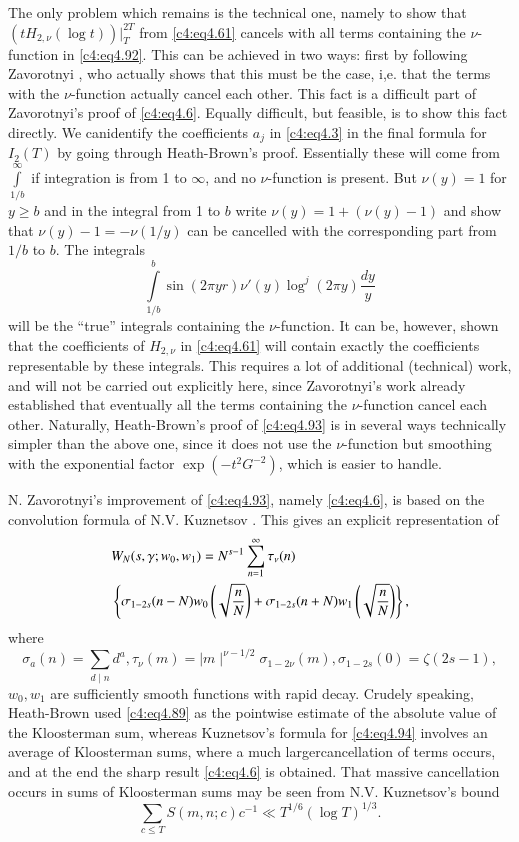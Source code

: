 The only problem which remains is the technical one, namely to show
that $(t H_{2, \nu} (\log t))\bigg|_T^{2T}$ from \eqref{c4:eq4.61}
cancels with all terms containing the $\nu$-function in
\eqref{c4:eq4.92}. This can be achieved in two ways: first by
following Zavorotnyi \cite{Zavorotnyi1}, who actually shows that this must be
the case, i,e. that the terms with the $\nu$-function actually cancel
each other. This fact is a difficult part of Zavorotnyi's proof of
\eqref{c4:eq4.6}. Equally difficult, but feasible, is to show this
fact directly. We can\pageoriginale identify the coefficients $a_j$ in
\eqref{c4:eq4.3} in the final formula for $I_2 (T)$ by going through
Heath-Brown's proof. Essentially these will come from
$\int\limits_{1/b}^\infty$ if integration is from 1 to $\infty$, and
no $\nu$-function is present. But $\nu (y) =1$ for $y \geq b$ and in
the integral from 1 to $b$ write $\nu(y) =1+ (\nu (y)-1)$ and show
that $\nu (y) -1 =- \nu (1/y)$ can be cancelled with the corresponding
part from $1/b$ to $b$. The  integrals
$$
\int\limits_{1/b}^b \sin (2 \pi y r)\nu' (y) \log^j (2 \pi y) \frac{dy}{y}
$$ 
will be the ``true'' integrals containing the $\nu$-function. It can
be, however, shown that the coefficients of $H_{2, \nu}$ in
\eqref{c4:eq4.61} will contain exactly the coefficients representable
by these integrals. This requires a lot of additional (technical)
work, and will not be carried out explicitly here, since Zavorotnyi's
work already established that eventually all the terms containing the
$\nu$-function cancel each other. Naturally, Heath-Brown's proof of
\eqref{c4:eq4.93} is in several ways technically simpler than the
above one, since it does not use the $\nu$-function but smoothing with
the exponential factor $\exp (-t^2 G^{-2})$, which is easier to
handle.

N. Zavorotnyi's improvement of \eqref{c4:eq4.93}, namely
\eqref{c4:eq4.6}, is based on the convolution formula of
N.V. Kuznetsov \cite{Kuznetsov4}. This gives an explicit representation of 
\begin{align}
  \label{c4:eq4.94}
  & W_N (s, \gamma; w_0, w_1) = N^{s-1}\sum_{n=1}^\infty
  \tau_\nu (n)\\ 
  & \left\{ \sigma_{1-2s} (n-N)w_0 \left(\sqrt{\frac{n}{N}} \right) +
  \sigma_{1-2s} (n + N)w_1 \left(\sqrt{\frac{n}{N}} \right) \right\},\notag
\end{align}
where
$$
\sigma_a (n)= \sum_{d \mid n} d^a, \tau_\nu (m) = \mid m
\mid^{\nu-1/2} \sigma_{1-2 \nu}(m), \sigma_{1- 2 s}(0) = \zeta (2 s-1), 
$$
$w_0, w_1$ are sufficiently smooth functions with rapid decay. Crudely\break
speaking, Heath-Brown used \eqref{c4:eq4.89} as the pointwise estimate
of the absolute value of the Kloosterman sum, whereas Kuznetsov's
formula for \eqref{c4:eq4.94} involves an average of Kloosterman sums,
where a much larger\pageoriginale cancellation of terms occurs, and at
the end the sharp result \eqref{c4:eq4.6} is obtained. That massive
cancellation occurs in sums of Kloosterman sums may be seen from
N.V. Kuznetsov's bound 
\begin{equation}
  \label{c4:eq4.95}
  \sum_{c \leq T} S(m, n; c)c^{-1} \ll T^{1/6} (\log T)^{1/3}.
\end{equation}

